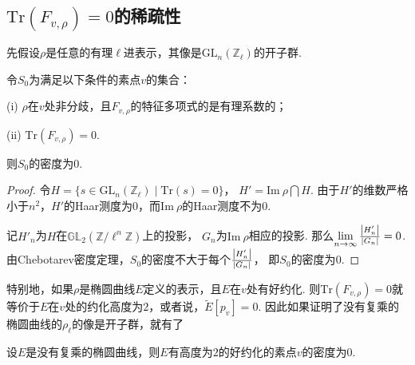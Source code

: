 \subsection{\texorpdfstring{$\mathrm{Tr}(F_{v, \rho})=0$}{tr F v rho}的稀疏性}

先假设$\rho$是任意的有理$\ell$进表示，其像是$\mathrm{GL}_n(\mathbb{Z}_{\ell})$的开子群.

\begin{cprop}
    令$S_0$为满足以下条件的素点$v$的集合：

    (i) $\rho$在$v$处非分歧，且$F_{v,\rho}$的特征多项式的是有理系数的；

    (ii) $\mathrm{Tr}(F_{v,\rho}) = 0$.

    则$S_0$的密度为$0$.
\end{cprop}

\begin{proof}
    令$H = \{s\in \mathrm{GL}_n(\mathbb{Z}_{\ell})\mid \mathrm{Tr}(s)=0\}$，
    $H' = \mathrm{Im}\ \rho \bigcap H$.
    由于$H'$的维数严格小于$n^2$，$H'$的Haar测度为$0$，而$\mathrm{Im}\ \rho$的Haar测度不为$0$.

    记$H'_n$为$H$在$\mathbb{GL}_2(\mathbb{Z}/\ell^n \mathbb{Z})$上的投影，
    $G_n$为$\mathrm{Im}\ \rho$相应的投影. 那么$\lim\limits_{n\to \infty} \frac{\left|H'_n\right|}{\left|G_n\right|} = 0$.
    由Chebotarev密度定理，$S_0$的密度不大于每个$\frac{\left|H'_n\right|}{\left|G_n\right|}$，
    即$S_0$的密度为$0$.
\end{proof}

特别地，如果$\rho$是椭圆曲线$E$定义的表示，且$E$在$v$处有好约化.
则$\mathrm{Tr}(F_{v,\rho})=0$就等价于$E$在$v$处的约化高度为$2$，或者说，$\tilde{E}[p_v] = 0$.
因此如果证明了没有复乘的椭圆曲线的$\rho_{\ell}$的像是开子群，就有了
\begin{ccor}
    设$E$是没有复乘的椭圆曲线，则$E$有高度为$2$的好约化的素点$v$的密度为$0$.\label{height2::sparse}
\end{ccor}
